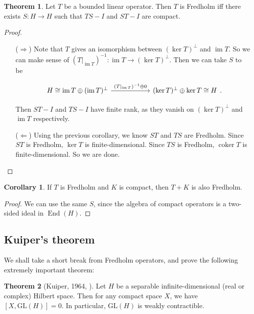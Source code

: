 \documentclass{shortart}
\theoremstyle{definition}
\newtheorem*{cor}{Corollary}
\newtheorem*{thm}{Theorem}
\DeclareMathOperator{\coker}{coker}
\DeclareMathOperator{\im}{im}
\DeclareMathOperator{\End}{End}
\newcommand\id{I}
\newcommand\GL{\mathrm{GL}}
\begin{document}
\begin{thm}
  Let $T$ be a bounded linear operator. Then $T$ is Fredholm iff there exists $S: H \to H$ such that $TS - \id $ and $ST - \id$ are compact.
\end{thm}

\begin{proof}\leavevmode
  \begin{itemize}
    \item[($\Rightarrow$)] Note that $T$ gives an isomorphism between $(\ker T)^\perp$ and $\im T$. So we can make sense of $(T|_{\im T})^{-1}: \im T \to (\ker T)^{\perp}$. Then we can take $S$ to be
      \begin{useimager}
        \[
          \begin{tikzcd}[column sep=2cm]
            H \cong \im T \oplus (\im T)^\perp \ar[r, "(T|_{\im T})^{-1} \oplus 0"] & (\ker T)^\perp \oplus \ker T \cong H
          \end{tikzcd}.
        \]
      \end{useimager}
      Then $ST - I$ and $TS - I$ have finite rank, as they vanish on $(\ker T)^\perp$ and $\im T$ respectively.
    \item[($\Leftarrow$)] Using the previous corollary, we know $ST$ and $TS$ are Fredholm. Since $ST$ is Fredholm, $\ker T$ is finite-dimensional. Since $TS$ is Fredholm, $\coker T$ is finite-dimensional. So we are done.\qedhere
  \end{itemize}
\end{proof}

\begin{cor}
  If $T$ is Fredholm and $K$ is compact, then $T + K$ is also Fredholm.
\end{cor}

\begin{proof}
  We can use the same $S$, since the algebra of compact operators is a two-sided ideal in $\End(H)$.
\end{proof}

\subsection{Kuiper's theorem}
We shall take a short break from Fredholm operators, and prove the following extremely important theorem:
\begin{thm}[Kuiper, 1964, \cite{kuiper196519}]
  Let $H$ be a separable infinite-dimensional (real or complex) Hilbert space. Then for any compact space $X$, we have $[X, \GL(H)] = 0$. In particular, $\GL(H)$ is weakly contractible.
\end{thm}
\end{document}
